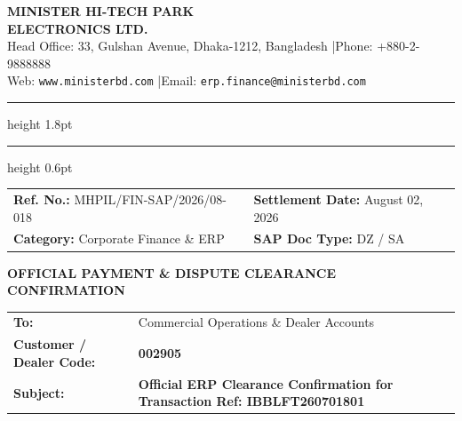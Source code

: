 \documentclass[11pt, a4paper]{article}
\begin{document}
\begin{center}
    {\Huge \bfseries \color{navyblue} MINISTER HI-TECH PARK} \\[2pt]
    {\large \bfseries \color{brandred} ELECTRONICS LTD.} \\[6pt]
    {\small \color{darktext} Head Office: 33, Gulshan Avenue, Dhaka-1212, Bangladesh \quad|\quad Phone: +880-2-9888888} \\
    {\small \color{darktext} Web: \texttt{www.ministerbd.com} \quad|\quad Email: \texttt{erp.finance@ministerbd.com}}
\end{center}

\vspace{-4pt}
\color{navyblue}\hrule height 1.8pt
\vspace{2pt}
\color{brandred}\hrule height 0.6pt
\vspace{10pt}

\begin{tcolorbox}[colback=lightbg, colframe=bordergray, arc=3pt, boxrule=0.5pt, left=8pt, right=8pt, top=6pt, bottom=6pt]
\small
\begin{tabularx}{\textwidth}{@{}X X@{}}
\textbf{Ref. No.:} MHPIL/FIN-SAP/2026/08-018 & \textbf{Settlement Date:} August 02, 2026 \\
\textbf{Category:} Corporate Finance \& ERP & \textbf{SAP Doc Type:} DZ / SA \\
\end{tabularx}
\end{tcolorbox}

\vspace{4pt}

\begin{tcolorbox}[colback=navyblue, colupper=white, halign=center, boxrule=0pt, arc=3pt, top=7pt, bottom=7pt]
    {\large \bfseries OFFICIAL PAYMENT \& DISPUTE CLEARANCE CONFIRMATION}
\end{tcolorbox}

\vspace{4pt}

\begin{tcolorbox}[colback=white, colframe=bordergray, arc=3pt, boxrule=0.5pt, left=10pt, right=10pt, top=8pt, bottom=8pt]
\small
\renewcommand{\arraystretch}{1.3}
\begin{tabular}{@{}l l@{}}
\textbf{To:} & Commercial Operations \& Dealer Accounts \\
\textbf{Customer / Dealer Code:} & \textbf{002905} \\
\textbf{Subject:} & \textbf{Official ERP Clearance Confirmation for Transaction Ref: IBBLFT260701801} \\
\end{tabular}
\end{tcolorbox}
\end{document}
